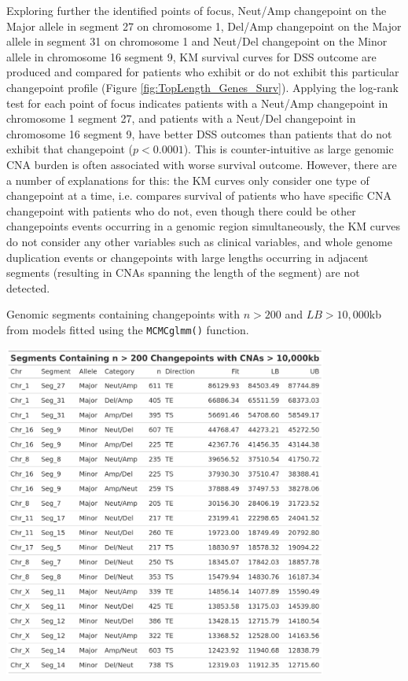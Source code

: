 Exploring further the identified points of focus, Neut/Amp changepoint on the Major allele in segment 27 on chromosome 1, Del/Amp changepoint on the Major allele in segment 31 on chromosome 1 and Neut/Del changepoint on the Minor allele in chromosome 16 segment 9, KM survival curves for DSS outcome are produced and compared for patients who exhibit or do not exhibit this particular changepoint profile (Figure \ref{fig:TopLength_Genes_Surv}). Applying the log-rank test for each point of focus indicates patients with a Neut/Amp changepoint in chromosome 1 segment 27, and patients with a Neut/Del changepoint in chromosome 16 segment 9, have better DSS outcomes than patients that do not exhibit that changepoint ($p < 0.0001$).  This is counter-intuitive as large genomic CNA burden is often associated with worse survival outcome. However, there are a number of explanations for this: the KM curves only consider one type of changepoint at a time, i.e. compares survival of patients who have specific CNA changepoint with patients who do not, even though there could be other changepoints events occurring in a genomic region simultaneously, the KM curves do not consider any other variables such as clinical variables, and whole genome duplication events or changepoints with large lengths occurring in adjacent segments (resulting in CNAs spanning the length of the segment) are not detected.

\vfill
\begin{table}[!htb]
\caption[Genomic segments containing changepoints with $n > 200$ and $LB > 10,000$kb from  models fitted using the \texttt{MCMCglmm()} function.]{Genomic segments containing changepoints with $n > 200$ and $LB > 10,000$kb from  models fitted using the \texttt{MCMCglmm()} function.}

\centering
\includegraphics[width = 0.8\textwidth]{../tables/Chapter_6/Segment_MCMC_10000_Five_Thesis.png}
\label{tab:TopLength_Seg_1}
\end{table}
\vfill 


